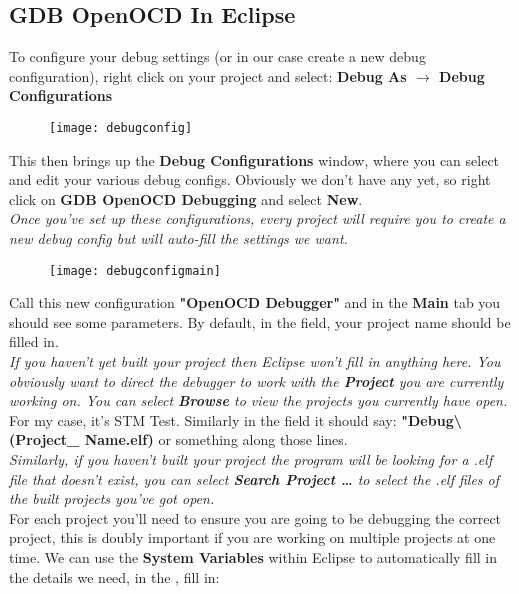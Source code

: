 {\subsection{GDB OpenOCD In Eclipse}
To configure your debug settings (or in our case create a new debug configuration), right click on your project and select:
\textbf{\color{Green} Debug As $\rightarrow$ Debug Configurations}
\par
\begin{figure}[htbp]
\centering
\texttt{[image: debugconfig]}
\end{figure}
This then brings up the \textbf{\color{Aquamarine} Debug Configurations} window, where you can select and edit your various debug configs.  Obviously we don't have any yet, so right click on \textbf{\color{Green} GDB OpenOCD Debugging} and select \textbf{\color{Purple} New}.
\\
\emph{\color{Gray} Once you've set up these configurations, every project will require you to create a new debug config but will auto-fill the settings we want.}
\begin{figure}[hbtp]
\centering
\texttt{[image: debugconfigmain]}
\end{figure}
\newpage
Call this new configuration \textbf{\color{Orange} "OpenOCD Debugger"} and in the \textbf{\color{Aquamarine} Main} tab you should see some parameters. By default, in the \underline{} field, your project name should be filled in.
\\
\emph{\color{Gray} If you haven't yet built your project then Eclipse won't fill in anything here. You obviously want to direct the debugger to work with the \textbf{\color{Aquamarine} Project} you are currently working on. You can select \textbf{\color{Purple} Browse} to view the projects you currently have open.}
\\
For my case, it's STM Test. Similarly in the \underline{} field it should say:
\textbf{\color{Orange} "Debug\textbackslash (Project\_ Name.elf)} or something along those lines.
\\
\emph{\color{Gray} Similarly, if you haven't built your project the program will be looking for a .elf file that doesn't exist, you can select \textbf{\color{Purple} Search Project \ldots} to select the .elf files of the built projects you've got open.}
\\
For each project you'll need to ensure you are going to be debugging the correct project, this is doubly important if you are working on multiple projects at one time. We can use the \textbf{System Variables} within Eclipse to automatically fill in the details we need, in the \underline{}, fill in:
}
